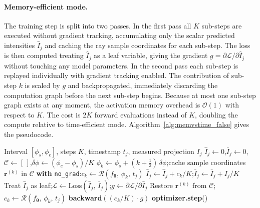 \documentclass[12pt, a4paper, twoside]{report}
\begin{document}
\paragraph{Memory-efficient mode.}
The training step is split into two passes. In the first pass all $K$ sub-steps are executed without gradient tracking, accumulating only the scalar predicted intensities $\hat{I}_j$ and caching the ray sample coordinates for each sub-step. The loss is then computed treating $\hat{I}_j$ as a leaf variable, giving the gradient $g = \partial\mathcal{L}/\partial\hat{I}_j$ without touching any model parameters. In the second pass each sub-step is replayed individually with gradient tracking enabled. The contribution of sub-step $k$ is scaled by $g$ and backpropagated, immediately discarding the computation graph before the next sub-step begins. Because at most one sub-step graph exists at any moment, the activation memory overhead is $\mathcal{O}(1)$ with respect to $K$. The cost is $2K$ forward evaluations instead of $K$, doubling the compute relative to time-efficient mode. Algorithm~\ref{alg:memvstime_false} gives the pseudocode.

\begin{algorithm}[htbp]
\caption{Continuous-Scan Training Step --- Memory-Efficient}
\label{alg:memvstime_false}
\begin{algorithmic}[1]
\Require Interval $[\phi_s, \phi_e]$, steps $K$, timestamp $t_j$, measured projection $I_j$
\State $\hat{I}_j \gets 0$,\quad $\bar{I}_j \gets 0$,\quad $\mathcal{C} \gets [\,]$,\quad $\delta\phi \gets (\phi_e - \phi_s)/K$
 \hfill{}
    \State $\phi_k \gets \phi_s + (k+\tfrac{1}{2})\,\delta\phi$;\quad cache sample coordinates $\mathbf{r}^{(k)}$ in $\mathcal{C}$
    \State \textbf{with} \texttt{no\_grad}:\quad $c_k \gets \mathcal{R}(f_{\boldsymbol{\theta}},\,\phi_k,\,t_j)$
    \State $\hat{I}_j \gets \hat{I}_j + c_k/K$;\quad $\bar{I}_j \gets \bar{I}_j + I_j/K$
\EndFor
\State Treat $\hat{I}_j$ as leaf;\quad $\mathcal{L} \gets \mathrm{Loss}(\hat{I}_j,\,\bar{I}_j)$;\quad $g \gets \partial\mathcal{L}/\partial\hat{I}_j$
 \hfill{}
    \State Restore $\mathbf{r}^{(k)}$ from $\mathcal{C}$;\quad $c_k \gets \mathcal{R}(f_{\boldsymbol{\theta}},\,\phi_k,\,t_j)$
    \State \textbf{backward}$((c_k/K)\cdot g)$ \hfill{}
\EndFor
\State \textbf{optimizer.step}()
\end{algorithmic}
\end{algorithm}
\end{document}
